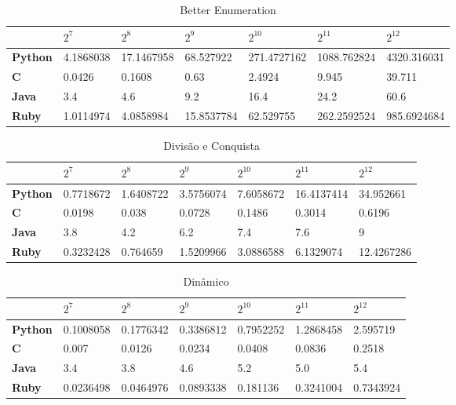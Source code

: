 \documentclass[
	12pt,				%
	oneside,   	        %
	a4paper,			%
	english,			%
	french,				%
	spanish,			%
	brazil,				%
	]{pacotes/abntex2}
\begin{document}
\begin{table}[!htb]
\centering
\caption{Better Enumeration}
\label{tab:betterenumeration}
\footnotesize   %
\begin{tabular}{l|llllll}
\toprule
& \textbf{$2^7$} & \textbf{$2^8$} & \textbf{$2^9$} & \textbf{$2^{10}$} & \textbf{$2^{11}$} & \textbf{$2^{12}$}\\ 
\midrule
\textbf{Python} & 4.1868038 & 17.1467958 & 68.527922 & 271.4727162 & 1088.762824 & 4320.316031 \\
\textbf{C} &  0.0426 & 0.1608 & 0.63 & 2.4924 & 9.945 & 39.711\\
\textbf{Java} & 3.4 & 4.6 & 9.2 & 16.4 & 24.2 & 60.6 \\
\textbf{Ruby} & 1.0114974 & 4.0858984 & 15.8537784 & 62.529755 & 262.2592524 & 985.6924684 \\
 \bottomrule
\end{tabular}
\end{table}

\begin{table}[!htb]
\centering
\caption{Divisão e Conquista}
\label{tab:divideandconquer}
\footnotesize   %
\begin{tabular}{l|llllll}
\toprule
& \textbf{$2^7$} & \textbf{$2^8$} & \textbf{$2^9$} & \textbf{$2^{10}$} & \textbf{$2^{11}$} & \textbf{$2^{12}$}\\ 
\midrule
\textbf{Python} &  0.7718672 & 1.6408722 & 3.5756074 & 7.6058672 & 16.4137414 & 34.952661\\
\textbf{C} & 0.0198 & 0.038 & 0.0728 & 0.1486 & 0.3014 & 0.6196 \\
\textbf{Java} & 3.8 & 4.2 & 6.2 & 7.4 & 7.6 & 9 \\
\textbf{Ruby} &  0.3232428 & 0.764659 & 1.5209966 & 3.0886588 & 6.1329074 & 12.4267286\\
 \bottomrule
\end{tabular}
\end{table}

\begin{table}[!htb]
\centering
\caption{Dinâmico}
\label{tab:dynamic}
\footnotesize   %
\begin{tabular}{l|llllll}
\toprule
& \textbf{$2^7$} & \textbf{$2^8$} & \textbf{$2^9$} & \textbf{$2^{10}$} & \textbf{$2^{11}$} & \textbf{$2^{12}$}\\ 
\midrule
\textbf{Python} &  0.1008058 & 0.1776342 & 0.3386812 & 0.7952252 & 1.2868458 & 2.595719\\
\textbf{C} & 0.007 & 0.0126 & 0.0234 & 0.0408 & 0.0836 & 0.2518 \\
\textbf{Java} & 3.4 & 3.8 & 4.6 & 5.2 & 5.0  & 5.4 \\
\textbf{Ruby} &  0.0236498 & 0.0464976 & 0.0893338 & 0.181136 & 0.3241004 & 0.7343924\\
 \bottomrule
\end{tabular}
\end{table}
\end{document}
